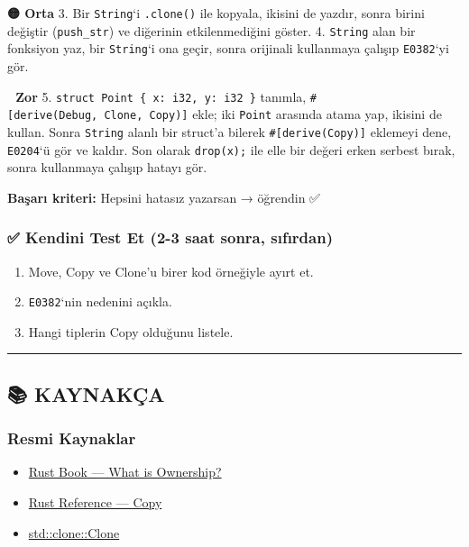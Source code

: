 \documentclass[12pt,a4paper]{article}
\begin{document}
\textbf{🟡 Orta}
3. Bir \texttt{String}`i \texttt{.clone()} ile kopyala, ikisini de yazdır, sonra birini değiştir (\texttt{push\_str}) ve diğerinin etkilenmediğini göster.
4. \texttt{String} alan bir fonksiyon yaz, bir \texttt{String}`i ona geçir, sonra orijinali kullanmaya çalışıp \texttt{E0382}`yi gör.

\textbf{🔴 Zor}
5. \texttt{struct\ Point\ \{\ x:\ i32,\ y:\ i32\ \}} tanımla, \texttt{\#{[}derive(Debug,\ Clone,\ Copy){]}} ekle; iki \texttt{Point} arasında atama yap, ikisini de kullan. Sonra \texttt{String} alanlı bir struct'a bilerek \texttt{\#{[}derive(Copy){]}} eklemeyi dene, \texttt{E0204}`ü gör ve kaldır. Son olarak \texttt{drop(x);} ile elle bir değeri erken serbest bırak, sonra kullanmaya çalışıp hatayı gör.

\textbf{Başarı kriteri:} Hepsini hatasız yazarsan → öğrendin ✅

\subsubsection{✅ Kendini Test Et (2-3 saat sonra, sıfırdan)}\label{kendini-test-et-2-3-saat-sonra-sıfırdan-10}

\begin{enumerate}
\def\labelenumi{\arabic{enumi}.}
\tightlist
\item
  Move, Copy ve Clone'u birer kod örneğiyle ayırt et.
\item
  \texttt{E0382}`nin nedenini açıkla.
\item
  Hangi tiplerin Copy olduğunu listele.
\end{enumerate}

\begin{center}\rule{0.5\linewidth}{0.5pt}\end{center}

\subsection{📚 KAYNAKÇA}\label{kaynakça-10}

\subsubsection{Resmi Kaynaklar}\label{resmi-kaynaklar-10}

\begin{itemize}
\tightlist
\item
  \href{https://doc.rust-lang.org/book/ch04-01-what-is-ownership.html}{Rust Book --- What is Ownership?}
\item
  \href{https://doc.rust-lang.org/reference/special-types-and-traits.html\#copy}{Rust Reference --- Copy}
\item
  \href{https://doc.rust-lang.org/std/clone/trait.Clone.html}{std::clone::Clone}
\end{itemize}
\end{document}
